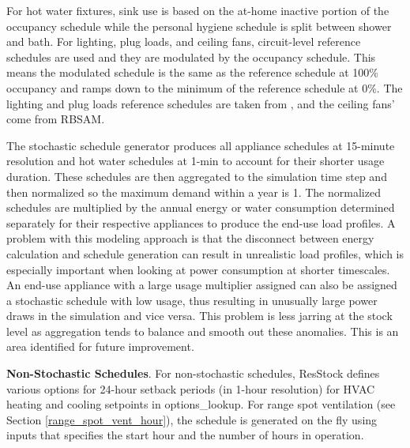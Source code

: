 For hot water fixtures, sink use is based on the at-home inactive portion of the occupancy schedule while the personal hygiene schedule is split between shower and bath. For lighting, plug loads, and ceiling fans, circuit-level reference schedules are used and they are modulated by the occupancy schedule. This means the modulated schedule is the same as the reference schedule at 100\% occupancy and ramps down to the minimum of the reference schedule at 0\%. The lighting and plug loads reference schedules are taken from \citet{Wilson2014}, and the ceiling fans' come from RBSAM.  

The stochastic schedule generator produces all appliance schedules at 15-minute resolution and hot water schedules at 1-min to account for their shorter usage duration. These schedules are then aggregated to the simulation time step and then normalized so the maximum demand within a year is 1. The normalized schedules are multiplied by the annual energy or water consumption determined separately for their respective appliances to produce the end-use load profiles. A problem with this modeling approach is that the disconnect between energy calculation and schedule generation can result in unrealistic load profiles, which is especially important when looking at power consumption at shorter timescales. An end-use appliance with a large usage multiplier assigned can also be assigned a stochastic schedule with low usage, thus resulting in unusually large power draws in the simulation and vice versa. This problem is less jarring at the stock level as aggregation tends to balance and smooth out these anomalies. This is an area identified for future improvement.


\textbf{Non-Stochastic Schedules}. For non-stochastic schedules, ResStock defines various options for 24-hour setback periods (in 1-hour resolution) for HVAC heating and cooling setpoints in options\_lookup. For range spot ventilation (see Section  \ref{range_spot_vent_hour}), the schedule is generated on the fly using inputs that specifies the start hour and the number of hours in operation.


